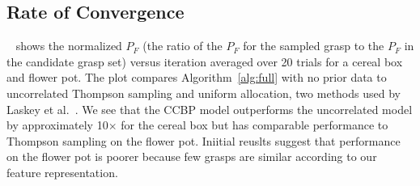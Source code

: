 \subsection{Rate of Convergence}

~ shows the normalized $P_F$ (the ratio of the $P_F$ for the sampled grasp to the $P_F$ in the candidate grasp set) versus iteration averaged over 20 trials for a cereal box and flower pot.
The plot compares Algorithm~\ref{alg:full} with no prior data to uncorrelated Thompson sampling and uniform allocation, two methods used by Laskey et al.~\cite{laskey2015bandits}.
We see that the CCBP model outperforms the uncorrelated model by approximately 10$\times$ for the cereal box but has comparable performance to Thompson sampling on the flower pot.
Iniitial reuslts suggest that performance on the flower pot is poorer because few grasps are similar according to our feature representation.


